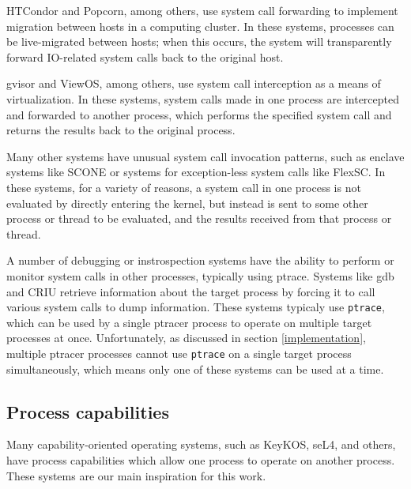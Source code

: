 \documentclass[letterpaper,twocolumn,10pt]{article}
\begin{document}
HTCondor\cite{condor} and Popcorn\cite{popcorn}, among others,
use system call forwarding to implement migration between hosts in a computing cluster.
In these systems, processes can be live-migrated between hosts;
when this occurs, the system will transparently forward IO-related system calls
back to the original host.

gvisor\cite{gvisor} and ViewOS\cite{viewos}, among others,
use system call interception as a means of virtualization.
In these systems,
system calls made in one process are intercepted and forwarded to another process,
which performs the specified system call and returns the results back to the original process.

Many other systems have unusual system call invocation patterns,
such as enclave systems like SCONE\cite{scone}\cite{eleos}
or systems for exception-less system calls like FlexSC\cite{flexsc}.
In these systems, for a variety of reasons,
a system call in one process is not evaluated by directly entering the kernel,
but instead is sent to some other process or thread to be evaluated,
and the results received from that process or thread.

A number of debugging or instrospection systems have the ability to perform or monitor system calls in other processes,
typically using ptrace.
Systems like gdb and CRIU
retrieve information about the target process by forcing it to call various system calls to dump information.
These systems typicaly use \texttt{ptrace},
which can be used by a single ptracer process to operate on multiple target processes at once.
Unfortunately, as discussed in section \ref{implementation},
multiple ptracer processes cannot use \texttt{ptrace} on a single target process simultaneously,
which means only one of these systems can be used at a time.

\subsection{Process capabilities}
Many capability-oriented operating systems, such as KeyKOS\cite{keykos}, seL4\cite{sel4}, and others\cite{fuchsia},
have process capabilities which allow one process to operate on another process.
These systems are our main inspiration for this work.
\end{document}
